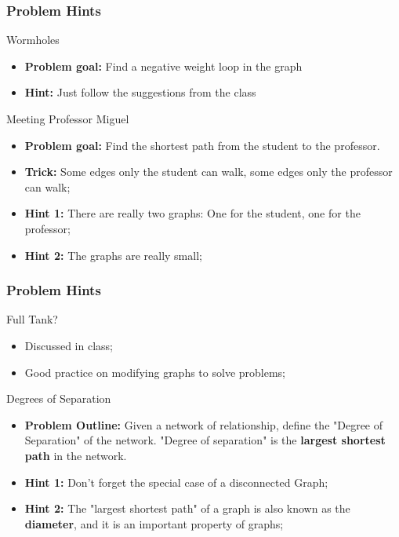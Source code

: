\begin{frame}
  \frametitle{Problem Hints}
  \begin{block}{Wormholes}
    \begin{itemize}
    \item {\bf Problem goal:} Find a negative weight loop in the graph
    \item {\bf Hint:} Just follow the suggestions from the class
    \end{itemize}
  \end{block}

  \begin{exampleblock}{Meeting Professor Miguel}
    \begin{itemize}
    \item {\bf Problem goal:} Find the shortest path from the student to the professor.
    \item {\bf Trick:} Some edges only the student can walk, some
      edges only the professor can walk;
    \item {\bf Hint 1:} There are really two graphs: One for the student, one for the
      professor;
    \item {\bf Hint 2:} The graphs are really small;
    \end{itemize}
  \end{exampleblock}
\end{frame}

\begin{frame}
  \frametitle{Problem Hints}
  \begin{block}{Full Tank?}
    \begin{itemize}
    \item Discussed in class;
    \item Good practice on modifying graphs to solve problems;
    \end{itemize}
  \end{block}
  \begin{exampleblock}{Degrees of Separation}
    \begin{itemize}
    \item {\bf Problem Outline:} Given a network of relationship, define the "Degree of Separation" of the network. "Degree of separation" is the {\bf largest shortest path} in the network.\bigskip

    \item {\bf Hint 1:} Don't forget the special case of a disconnected Graph;
    \item {\bf Hint 2:} The "largest shortest path" of a graph is also known as the {\bf diameter}, and it is an important property of graphs;
    \end{itemize}
  \end{exampleblock}
\end{frame}


